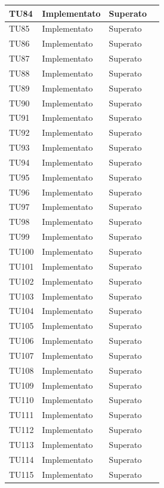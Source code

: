 \begin{longtable}{|>{\centering\arraybackslash}m{1.6cm}|>{\centering\arraybackslash}m{6.41cm}|>{\centering\arraybackslash}m{3.1cm}| c |}
	TU84 & Implementato & Superato  \\ \hline
	TU85 & Implementato & Superato  \\ \hline
	TU86 & Implementato & Superato  \\ \hline
	TU87 & Implementato & Superato  \\ \hline
	TU88 & Implementato & Superato  \\ \hline
	TU89 & Implementato & Superato  \\ \hline
	TU90 & Implementato & Superato  \\ \hline
	TU91 & Implementato & Superato  \\ \hline
	TU92 & Implementato & Superato  \\ \hline
	TU93 & Implementato & Superato  \\ \hline
	TU94 & Implementato & Superato  \\ \hline
	TU95 & Implementato & Superato  \\ \hline
	TU96 & Implementato & Superato  \\ \hline
	TU97 & Implementato & Superato  \\ \hline
	TU98 & Implementato & Superato  \\ \hline
	TU99 & Implementato & Superato  \\ \hline
	TU100 & Implementato & Superato  \\ \hline
	TU101 & Implementato & Superato  \\ \hline
	TU102 & Implementato & Superato  \\ \hline
	TU103 & Implementato & Superato  \\ \hline
	TU104 & Implementato & Superato  \\ \hline
	TU105 & Implementato & Superato  \\ \hline
	TU106 & Implementato & Superato  \\ \hline
	TU107 & Implementato & Superato  \\ \hline
	TU108 & Implementato & Superato  \\ \hline
	TU109 & Implementato & Superato  \\ \hline
	TU110 & Implementato & Superato  \\ \hline
	TU111 & Implementato & Superato  \\ \hline
	TU112 & Implementato & Superato  \\ \hline
	TU113 & Implementato & Superato  \\ \hline
	TU114 & Implementato & Superato  \\ \hline
	TU115 & Implementato & Superato  \\ \hline

\end{longtable}
